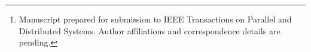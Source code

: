 \author{Author Names to Be Added%
\thanks{Manuscript prepared for submission to IEEE Transactions on Parallel and
Distributed Systems. Author affiliations and correspondence details are pending.}}
